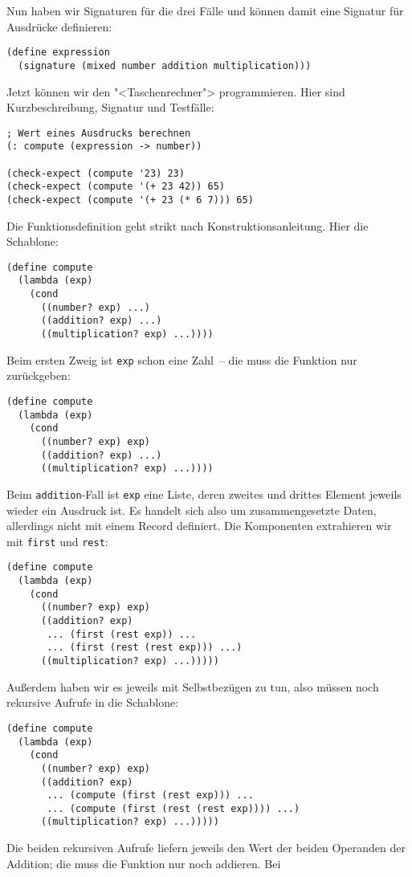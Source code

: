 %
Nun haben wir Signaturen für die drei Fälle und können damit eine
Signatur für Ausdrücke definieren:
%
\begin{lstlisting}
(define expression
  (signature (mixed number addition multiplication)))
\end{lstlisting}
%
Jetzt können wir den "<Taschenrechner"> programmieren.  Hier sind
Kurzbeschreibung, Signatur und Testfälle:
%
\begin{lstlisting}
; Wert eines Ausdrucks berechnen
(: compute (expression -> number))

(check-expect (compute '23) 23)
(check-expect (compute '(+ 23 42)) 65)
(check-expect (compute '(+ 23 (* 6 7))) 65)
\end{lstlisting}
%
Die Funktionsdefinition geht strikt nach Konstruktionsanleitung.  Hier
die Schablone:
%
\begin{lstlisting}
(define compute
  (lambda (exp)
    (cond
      ((number? exp) ...)
      ((addition? exp) ...)
      ((multiplication? exp) ...))))
\end{lstlisting}
%
Beim ersten Zweig ist \lstinline{exp} schon eine Zahl~-- die muss die
Funktion nur zurückgeben:
%
\begin{lstlisting}
(define compute
  (lambda (exp)
    (cond
      ((number? exp) exp)
      ((addition? exp) ...)
      ((multiplication? exp) ...))))
\end{lstlisting}
%
Beim \lstinline{addition}-Fall ist \lstinline{exp} eine Liste, deren
zweites und drittes Element jeweils wieder ein Ausdruck ist.  Es
handelt sich also um zusammengesetzte Daten, allerdings nicht mit
einem Record definiert.  Die Komponenten extrahieren wir mit
\lstinline{first} und \lstinline{rest}:
%
\begin{lstlisting}
(define compute
  (lambda (exp)
    (cond
      ((number? exp) exp)
      ((addition? exp)
       ... (first (rest exp)) ...
       ... (first (rest (rest exp))) ...)
      ((multiplication? exp) ...)))))
\end{lstlisting}
%
Außerdem haben wir es jeweils mit Selbstbezügen zu tun, also müssen noch
rekursive Aufrufe in die Schablone:
%
\begin{lstlisting}
(define compute
  (lambda (exp)
    (cond
      ((number? exp) exp)
      ((addition? exp)
       ... (compute (first (rest exp))) ...
       ... (compute (first (rest (rest exp)))) ...)
      ((multiplication? exp) ...)))))
\end{lstlisting}
%
Die beiden rekursiven Aufrufe liefern jeweils den Wert der beiden
Operanden der Addition; die muss die Funktion nur noch addieren.  Bei
